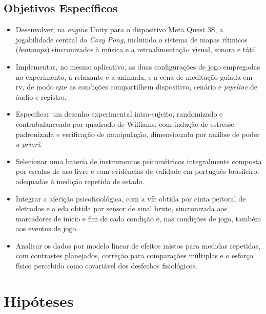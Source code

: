 \subsection{Objetivos Específicos}\label{subsec:obj-especificos}

\begin{itemize}
    \item Desenvolver, na \textit{engine} Unity para o dispositivo Meta Quest 3S, a jogabilidade central do \textit{Cozy Pong}, incluindo o sistema de mapas rítmicos (\textit{beatmaps}) sincronizados à música e a retroalimentação visual, sonora e tátil.
    \item Implementar, no mesmo aplicativo, as duas configurações de jogo empregadas no experimento, a relaxante e a animada, e a cena de meditação guiada em \gls{rv}, de modo que as condições compartilhem dispositivo, cenário e \textit{pipeline} de áudio e registro.
    \item Especificar um desenho experimental intra-sujeito, randomizado e contrabalanceado por quadrado de Williams, com indução de estresse padronizada e verificação de manipulação, dimensionado por análise de poder \textit{a priori}.
    \item Selecionar uma bateria de instrumentos psicométricos integralmente composta por escalas de uso livre e com evidências de validade em português brasileiro, adequadas à medição repetida de estado.
    \item Integrar a aferição psicofisiológica, com a \gls{vfc} obtida por cinta peitoral de eletrodos e a \gls{eda} obtida por sensor de sinal bruto, sincronizada aos marcadores de início e fim de cada condição e, nas condições de jogo, também aos eventos de jogo.
    \item Analisar os dados por modelo linear de efeitos mistos para medidas repetidas, com contrastes planejados, correção para comparações múltiplas e o esforço físico percebido como covariável dos desfechos fisiológicos.
\end{itemize}

\section{Hipóteses}\label{sec:hipoteses}

